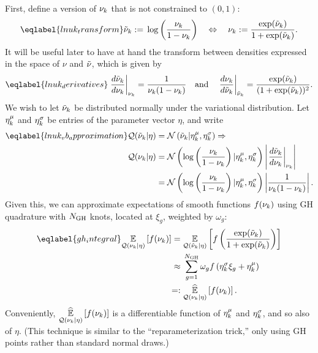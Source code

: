 First, define a version of $\nu_{k}$ that is not constrained to $(0,1)$:
%
\begin{align}\eqlabel{lnuk_transform}
%
\lnuk :={} \log \left( \frac{\nuk}{1 - \nuk} \right)
\quad\Leftrightarrow\quad
\nuk :={} \frac{\exp(\lnuk)}{1 + \exp(\lnuk)}.
%
\end{align}
%
It will be useful later to have at hand the transform between densities
expressed in the space of $\nu$ and $\tilde{\nu}$, which is given by
%
\begin{align}\eqlabel{lnuk_derivatives}
%
\fracat{d \lnu_\k}{ d\nuk}{\nuk} ={}
    \frac{1}{\nuk (1 - \nuk)} \mathand
%
\fracat{d \nuk}{ d\lnuk}{\lnuk} ={}
    \frac{\exp(\lnuk)}{(1 + \exp(\lnuk))^2}.
%
\end{align}
%
We wish to let $\tilde{\nu}_k$ be distributed normally under the variational
distribution.  Let $\eta^{\mu}_k$ and $\eta^{\sigma}_k$ be entries of the parameter
vector $\eta$, and write
%
\begin{align}\eqlabel{lnuk_vb_approximation}
%
\q(\lnu_\k \vert \eta) ={}& \normdist{\lnu_\k \vert \lnumean_\k, \lnusd_\k}
\Rightarrow \\
\q(\nuk \vert \eta) ={}&
    \normdist{\log \left( \frac{\nuk}{1 - \nuk} \right)
        \vert \lnumean_\k, \lnusd_\k}
    \left|\fracat{d \lnu_\k}{ d\nuk}{\nuk}\right|
\nonumber\\={}&
\normdist{\log \left( \frac{\nuk}{1 - \nuk} \right)
        \vert \lnumean_\k, \lnusd_\k}
    \left|\frac{1}{\nuk (1 - \nuk)}\right|.
\nonumber
%
\end{align}
%
Given this, we can approximate expectations of smooth functions
$f(\nu_{k})$ using GH quadrature with $N_{\mathrm{GH}}$ knots,
located at $\xi_g$, weighted by $\omega_g$:
%
\begin{align}\eqlabel{gh_integral}
%
\expect{\q(\nuk \vert \eta)}{f(\nuk)} ={}&
\expect{\q(\lnu_\k \vert \eta)}
       {f\left(\frac{\exp(\lnu_\k)}{1 + \exp(\lnu_\k)}\right)}
\nonumber\\\approx{}&
    \sum_{g=1}^{\ngh} \omega_g f\left(\lnusd_\k \xi_{g} + \lnumean_\k\right)
 \nonumber\\=:{}&
\expecthat{\q(\nuk \vert \eta)}{f(\nuk)}.
%
\end{align}
%
Conveniently, $\underset{\mathcal{Q}(\nu_{k} \vert \eta)}{\widehat{\mathbb{E}}}\left[f(\nu_{k})\right]$ is a differentiable
function of $\eta^{\mu}_k$ and $\eta^{\sigma}_k$, and so also of $\eta$.  (This
technique is similar to the ``reparameterization trick,'' only using
GH points rather than standard normal draws.)
